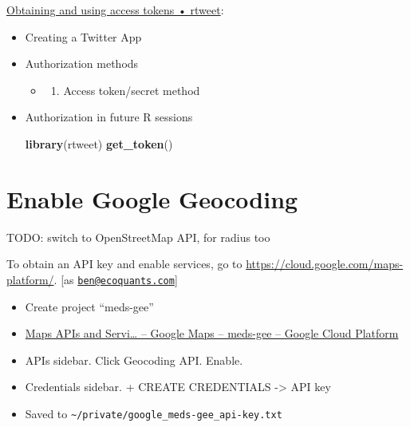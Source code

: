 \documentclass[]{book}
\newenvironment{Shaded}{\begin{snugshade}}{\end{snugshade}}
\newcommand{\KeywordTok}[1]{\textcolor[rgb]{0.13,0.29,0.53}{\textbf{#1}}}
\newcommand{\NormalTok}[1]{#1}
\providecommand{\tightlist}{%
  \setlength{\itemsep}{0pt}\setlength{\parskip}{0pt}}
\begin{document}
\href{https://rtweet.info/articles/auth.html}{Obtaining and using access tokens • rtweet}:

\begin{itemize}
\item
  Creating a Twitter App
\item
  Authorization methods

  \begin{itemize}
  \item
    \begin{enumerate}
    \def\labelenumi{\arabic{enumi}.}
    \setcounter{enumi}{1}
    \tightlist
    \item
      Access token/secret method
    \end{enumerate}
  \end{itemize}
\item
  Authorization in future R sessions

\begin{Shaded}
\begin{Highlighting}[]
\KeywordTok{library}\NormalTok{(rtweet)}
\KeywordTok{get_token}\NormalTok{()}
\end{Highlighting}
\end{Shaded}
\end{itemize}

\hypertarget{enable-google-geocoding}{%
\section{Enable Google Geocoding}\label{enable-google-geocoding}}

TODO: switch to OpenStreetMap API, for radius too

To obtain an API key and enable services, go to \url{https://cloud.google.com/maps-platform/}. {[}as \href{mailto:ben@ecoquants.com}{\nolinkurl{ben@ecoquants.com}}{]}

\begin{itemize}
\tightlist
\item
  Create project ``meds-gee''
\item
  \href{https://console.cloud.google.com/google/maps-apis/new?authuser=1\&project=meds-gee\&folder=\&organizationId=}{Maps APIs and Servi\ldots{} -- Google Maps -- meds-gee -- Google Cloud Platform}
\item
  APIs sidebar. Click Geocoding API. Enable.
\item
  Credentials sidebar. + CREATE CREDENTIALS -\textgreater{} API key
\item
  Saved to \texttt{\textasciitilde{}/private/google\_meds-gee\_api-key.txt}
\end{itemize}
\end{document}
